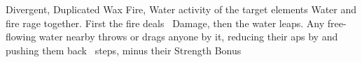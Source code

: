   {Divergent, Duplicated}%
  {Wax}%
  {Fire, Water}%
  {activity of the target elements}%
  {%
    Water and fire rage together.
    First the fire deals \showDam~Damage, then the water leaps.
    Any free-flowing water nearby throws or drags anyone by it, reducing their \glspl{ap} by  and pushing them back ~\glspl{step}, minus their Strength Bonus}%
  {}
